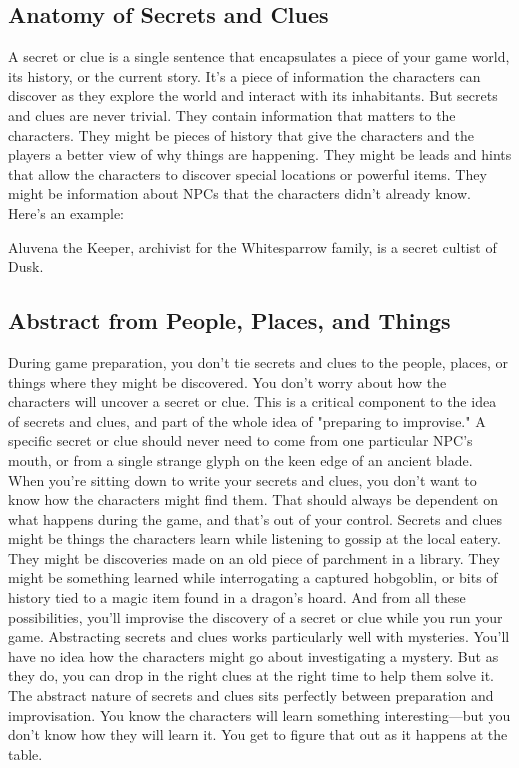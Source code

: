 \documentclass[10pt,a4paper,twoside,bg=print,twocolumn,openany,nodeprecatedcode]{dndbook}
\begin{document}
\subsection{Anatomy of Secrets and Clues}
A secret or clue is a single sentence that encapsulates a piece of your game world, its history, or the current story. It's a piece of information the characters can discover as they explore the world and interact with its inhabitants. But secrets and clues are never trivial. They contain information that matters to the characters. They might be pieces of history that give the characters and the players a better view of why things are happening. They might be leads and hints that allow the characters to discover special locations or powerful items. They might be information about NPCs that the characters didn't already know.
Here's an example:
\begin{DndSidebar}[float=!b]{}
Aluvena the Keeper, archivist for the Whitesparrow family, is a secret cultist of Dusk.


\end{DndSidebar}

\subsection{Abstract from People, Places, and Things}
During game preparation, you don't tie secrets and clues to the people, places, or things where they might be discovered. You don't worry about how the characters will uncover a secret or clue. This is a critical component to the idea of secrets and clues, and part of the whole idea of "preparing to improvise."
A specific secret or clue should never need to come from one particular NPC's mouth, or from a single strange glyph on the keen edge of an ancient blade. When you're sitting down to write your secrets and clues, you don't want to know how the characters might find them. That should always be dependent on what happens during the game, and that's out of your control.
Secrets and clues might be things the characters learn while listening to gossip at the local eatery. They might be discoveries made on an old piece of parchment in a library. They might be something learned while interrogating a captured hobgoblin, or bits of history tied to a magic item found in a dragon's hoard. And from all these possibilities, you'll improvise the discovery of a secret or clue while you run your game.
Abstracting secrets and clues works particularly well with mysteries. You'll have no idea how the characters might go about investigating a mystery. But as they do, you can drop in the right clues at the right time to help them solve it.
The abstract nature of secrets and clues sits perfectly between preparation and improvisation. You know the characters will learn something interesting—but you don't know how they will learn it. You get to figure that out as it happens at the table.
\end{document}
